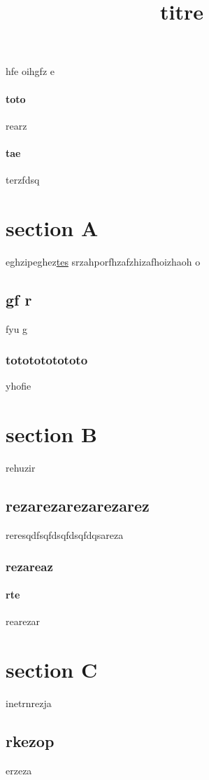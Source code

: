 \documentclass{article}
\title{titre}
\begin{document}
\maketitle
hfe oihgfz e
\paragraph{toto}{rearz}
\paragraph{tae}{terzfdsq}
\section{section A}{eghzipeghez\underline{\color{red}tes}
srzahporfhzafzhizafhoizhaoh o\subsection{gf r}{fyu g\subsubsection{tototototototo}{yhofie}
}}

\section{section B}{rehuzir\subsection{rezarezarezarezarez}{reresqdfsqfds\color{red}qfdsqfdqsareza\subsubsection{rezareaz}{\paragraph{rte}{rearezar}}}}

\section{section C}{inetrnrezja\subsection{rkezop}{erzeza}}
\end{document}
